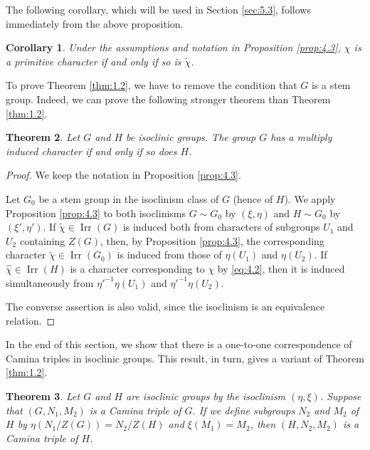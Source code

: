 \documentclass[a4paper,12pt]{article}
\newtheorem{theorem}{Theorem}[section]
\newtheorem{corollary}[theorem]{Corollary}
\theoremstyle{definition}
\theoremstyle{remark}
\DeclareMathOperator{\irr}{Irr}
\numberwithin{equation}{section}
\begin{document}
The following corollary, which will be used in Section \ref{sec:5.3},
follows immediately from the above proposition.

\begin{corollary} \label{cor:4.4}
    Under the assumptions and notation in Proposition \ref{prop:4.3}, 
    $\chi $ is a primitive character if and only if so is $\tilde{\chi}$.
\end{corollary}

To prove Theorem \ref{thm:1.2}, we have to remove the condition that $G$ is a stem group.
Indeed, we can prove the following stronger theorem than Theorem \ref{thm:1.2}.

\begin{theorem}
    Let $G$ and $H$ be isoclinic groups. The group $G$ has a multiply induced character if and only
    if so does $H$.
\end{theorem}
 \begin{proof}
   We keep the notation in Proposition \ref{prop:4.3}.

   Let $G_0$ be a stem group in the isoclinism class of $G$ (hence of $H$).
   We apply Proposition \ref{prop:4.3} to both isoclinisms $G \sim G_0$ by $(\xi, \eta )$ 
   and $H \sim G_0$ by $(\xi',\eta' )$.
   If $\tilde{\chi }\in \irr (G) $ is induced both from characters of subgroups $U_1$ and $U_2$ 
   containing $Z(G)$, then, by Proposition \ref{prop:4.3}, 
   the corresponding character $\tilde{\chi} \in \irr (G_0)$  
   is induced from those of $\eta (U_1)$ and $\eta (U_2)$.
   If $\hat{\chi} \in \irr (H)$ is a character corresponding to $\chi$ by \eqref{eq:4.2}, then
   it is induced simultaneously from $\eta'^{-1} \eta (U_1)$ and  $\eta'^{-1} \eta (U_2)$.
   
   The converse assertion is also valid, since the isoclinism is an equivalence relation.
 \end{proof}

In the end of this section, we show that there is a one-to-one correspondence of Camina triples 
in isoclinic groups. This result, in turn, gives a variant of Theorem \ref{thm:1.2}.

\begin{theorem}  \label{prop:4.5}
Let $G$ and $H$ are isoclinic groups by the isoclinism $(\eta, \xi )$.
Suppose that $(G,N_1,M_2)$ is a Camina triple of $G$. If we define subgroups $N_2$ and $M_2$ of $H$ by
$\eta (N_1/Z (G)) = N_2 /Z (H)$ and $ \xi (M_1) = M_2$, then $(H,N_2, M_2)$ is a Camina triple 
of $H$.
\end{theorem}
\end{document}
